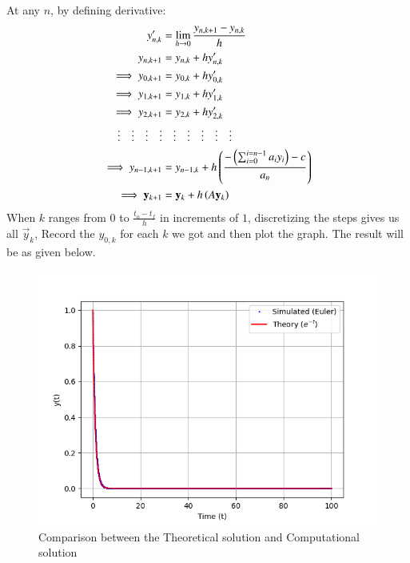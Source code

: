 \documentclass[journal]{IEEEtran}
\begin{document}
At any $n$, by defining derivative:
\begin{align}
	y_{n,k}^{\prime} &= \lim_{h\to 0}\frac{y_{n,k+1} - y_{n,k}}{h}\\
	y_{n,k+1} &= y_{n,k} + hy_{n,k}^{\prime}\\
    \implies y_{0,k+1} &= y_{0,k} + hy_{0,k}^{\prime}\\
    \implies y_{1,k+1} &= y_{1,k} + hy_{1,k}^{\prime}\\
    \implies y_{2,k+1} &= y_{2,k} + hy_{2,k}^{\prime}\\
\vdots\quad\vdots\quad\vdots\quad\vdots&\quad\vdots\quad\vdots\quad\vdots\quad\vdots\quad\vdots\\
    \implies y_{n-1,k+1} &= y_{n-1,k} + h\left(\frac{-\left(\sum_{i=0}^{i=n-1}a_iy_i\right)-c}{a_n}\right)\\
    \implies  \mathbf{y}_{k+1}&=\mathbf{y}_k+h\left(A\mathbf{y}_k\right)
\end{align}
When $k$ ranges from $0$ to $\frac{t_o-t_f}{h}$ in increments of $1$, discretizing the steps gives us all $\vec{y}_k$, Record the $y_{0,k}$ for each $k$ we got and then plot the graph. The result will be as given below.
\begin{figure}[h!]
   \centering
   \includegraphics[width=1\linewidth]{figs/fig.png}
   \caption{Comparison between the Theoretical solution and Computational solution}
   \label{stemplot}
\end{figure}
\end{document}
